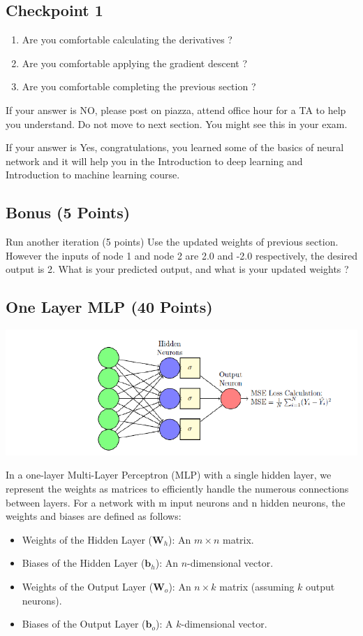 \documentclass{article}
\begin{document}
\subsection{Checkpoint 1}
\begin{enumerate}
    \item  Are you comfortable calculating the derivatives ?
\item Are you comfortable applying the gradient descent ?
\item Are you comfortable completing the previous section ?
\end{enumerate}

If your answer is NO, please post on piazza, attend office hour for a TA to help you understand.
Do not move to next section. You might see this in your exam.


If your answer is Yes, congratulations, you learned some of the basics of neural network and it will help you
in the Introduction to deep learning and Introduction to machine learning course.

\subsection{Bonus (5 Points)}
Run another iteration (5 points) Use the updated weights of previous section. However the inputs of
node 1 and node 2 are 2.0 and -2.0 respectively, the desired output is 2. What is your predicted output, and
what is your updated weights ?

\subsection{One Layer MLP (40 Points)}

\begin{center}
    \includegraphics[scale=0.5]{nn1.png}
\end{center}
In a one-layer Multi-Layer Perceptron (MLP) with a single hidden layer, we represent the weights as matrices
to efficiently handle the numerous connections between layers. For a network with m input neurons and n
hidden neurons, the weights and biases are defined as follows:
\begin{itemize}
    \item Weights of the Hidden Layer ($\mathbf{W}_h$): An $m \times n$ matrix.
    \item Biases of the Hidden Layer ($\mathbf{b}_h$): An $n$-dimensional vector.
    \item Weights of the Output Layer ($\mathbf{W}_o$): An $n \times k$ matrix (assuming $k$ output neurons).
    \item Biases of the Output Layer ($\mathbf{b}_o$): A $k$-dimensional vector.
\end{itemize}
\end{document}
